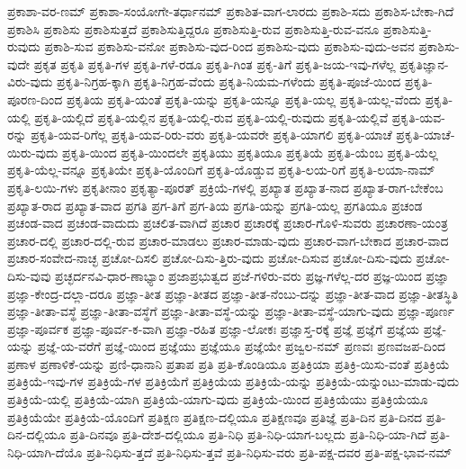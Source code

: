 {ಪ್ರಕಾಶಾ-ವರ-ಣಮ್
ಪ್ರಕಾಶಾ-ಸಂಯೋಗೇ-ತರ್ಧಾನಮ್
ಪ್ರಕಾಶಿತ-ವಾಗ-ಲಾರದು
ಪ್ರಕಾಶಿ-ಸದು
ಪ್ರಕಾಶಿಸ-ಬೇಕಾ-ಗಿದೆ
ಪ್ರಕಾಶಿಸಿ
ಪ್ರಕಾಶಿಸು
ಪ್ರಕಾಶಿಸುತ್ತದೆ
ಪ್ರಕಾಶಿಸುತ್ತಿದ್ದರೂ
ಪ್ರಕಾಶಿಸುತ್ತಿ-ರುವ
ಪ್ರಕಾಶಿಸುತ್ತಿ-ರುವ-ವನೂ
ಪ್ರಕಾಶಿಸುತ್ತಿ-ರುವುದು
ಪ್ರಕಾಶಿ-ಸುವ
ಪ್ರಕಾಶಿಸು-ವನೋ
ಪ್ರಕಾಶಿಸು-ವುದ-ರಿಂದ
ಪ್ರಕಾಶಿಸು-ವುದು
ಪ್ರಕಾಶಿಸು-ವುದು-ಅವನ
ಪ್ರಕಾಶಿಸು-ವುದೇ
ಪ್ರಕೃತ
ಪ್ರಕೃತಿ
ಪ್ರಕೃತಿ-ಗಳ
ಪ್ರಕೃತಿ-ಗಳೆ-ರಡೂ
ಪ್ರಕೃತಿ-ಗಿಂತ
ಪ್ರಕೃ-ತಿಗೆ
ಪ್ರಕೃತಿ-ಜಯ-ಇವು-ಗಳೆಲ್ಲ
ಪ್ರಕೃತಿಜ್ಞಾನ-ವಿರು-ವುದು
ಪ್ರಕೃತಿ-ನಿಗ್ರಹ-ಕ್ಕಾಗಿ
ಪ್ರಕೃತಿ-ನಿಗ್ರಹ-ವೆಂದು
ಪ್ರಕೃತಿ-ನಿಯಮ-ಗಳೆಂದು
ಪ್ರಕೃತಿ-ಪೂಜೆ-ಯಿಂದ
ಪ್ರಕೃತಿ-ಪೂರಣ-ದಿಂದ
ಪ್ರಕೃತಿಯ
ಪ್ರಕೃತಿ-ಯಂತೆ
ಪ್ರಕೃತಿ-ಯನ್ನು
ಪ್ರಕೃತಿ-ಯನ್ನೂ
ಪ್ರಕೃತಿ-ಯಲ್ಲ
ಪ್ರಕೃತಿ-ಯಲ್ಲ-ವೆಂದು
ಪ್ರಕೃತಿ-ಯಲ್ಲಿ
ಪ್ರಕೃತಿ-ಯಲ್ಲಿದೆ
ಪ್ರಕೃತಿ-ಯಲ್ಲಿನ
ಪ್ರಕೃತಿ-ಯಲ್ಲಿ-ರುವ
ಪ್ರಕೃತಿ-ಯಲ್ಲಿ-ರುವುದು
ಪ್ರಕೃತಿ-ಯಲ್ಲಿವೆ
ಪ್ರಕೃತಿ-ಯವ-ರನ್ನು
ಪ್ರಕೃತಿ-ಯವ-ರಿಗೆಲ್ಲ
ಪ್ರಕೃತಿ-ಯವ-ರಿರು-ವರು
ಪ್ರಕೃತಿ-ಯವರೇ
ಪ್ರಕೃತಿ-ಯಾಗಲಿ
ಪ್ರಕೃತಿ-ಯಾಚೆ
ಪ್ರಕೃತಿ-ಯಾಚೆ-ಯಿರು-ವುದು
ಪ್ರಕೃತಿ-ಯಿಂದ
ಪ್ರಕೃತಿ-ಯಿಂದಲೇ
ಪ್ರಕೃತಿಯು
ಪ್ರಕೃತಿಯೂ
ಪ್ರಕೃತಿಯೆ
ಪ್ರಕೃತಿ-ಯೆಂಬ
ಪ್ರಕೃತಿ-ಯೆಲ್ಲ
ಪ್ರಕೃತಿ-ಯೆಲ್ಲ-ವನ್ನೂ
ಪ್ರಕೃತಿಯೇ
ಪ್ರಕೃತಿ-ಯೊಂದಿಗೆ
ಪ್ರಕೃತಿ-ಯೊಡ್ಡುವ
ಪ್ರಕೃತಿ-ಲಯ-ರಿಗೆ
ಪ್ರಕೃತಿ-ಲಯಾ-ನಾಮ್
ಪ್ರಕೃತಿ-ಲಯಿ-ಗಳು
ಪ್ರಕೃತೀನಾಂ
ಪ್ರಕೃತ್ಯಾ-ಪೂರತ್
ಪ್ರಕ್ರಿಯೆ-ಗಳಲ್ಲಿ
ಪ್ರಖ್ಯಾತ
ಪ್ರಖ್ಯಾತ-ನಾದ
ಪ್ರಖ್ಯಾತ-ರಾಗ-ಬೇಕೆಂಬ
ಪ್ರಖ್ಯಾತ-ರಾದ
ಪ್ರಖ್ಯಾತ-ವಾದ
ಪ್ರಗತಿ
ಪ್ರಗ-ತಿಗೆ
ಪ್ರಗ-ತಿಯ
ಪ್ರಗತಿ-ಯನ್ನು
ಪ್ರಗತಿ-ಯಲ್ಲ
ಪ್ರಗತಿಯೂ
ಪ್ರಚಂಡ
ಪ್ರಚಂಡ-ವಾದ
ಪ್ರಚಂಡ-ವಾದುದು
ಪ್ರಚಲಿತ-ವಾಗಿದೆ
ಪ್ರಚಾರ
ಪ್ರಚಾರಕ್ಕೆ
ಪ್ರಚಾರ-ಗೊಳಿ-ಸುವರು
ಪ್ರಚಾರಣಾ-ಯಂತ್ರ
ಪ್ರಚಾರ-ದಲ್ಲಿ
ಪ್ರಚಾರ-ದಲ್ಲಿ-ರುವ
ಪ್ರಚಾರ-ಮಾಡಲು
ಪ್ರಚಾರ-ಮಾಡು-ವುದು
ಪ್ರಚಾರ-ವಾಗ-ಬೇಕಾದ
ಪ್ರಚಾರ-ವಾದ
ಪ್ರಚಾರ-ಸಂವೇದ-ನಾಚ್ಛ
ಪ್ರಚೋ-ದಿಸಲಿ
ಪ್ರಚೋ-ದಿಸು-ತ್ತಿರು-ವುದು
ಪ್ರಚೋ-ದಿಸುವ
ಪ್ರಚೋ-ದಿಸು-ವುದು
ಪ್ರಚೋ-ದಿಸು-ವುವು
ಪ್ರಚ್ಛರ್ದನವಿ-ಧಾರ-ಣಾಭ್ಯಾಂ
ಪ್ರಜಾಪ್ರಭುತ್ವದ
ಪ್ರಜೆ-ಗಳಿರು-ವರು
ಪ್ರಜ್ಞ-ಗಳೆಲ್ಲ-ದರ
ಪ್ರಜ್ಞ-ಯಿಂದ
ಪ್ರಜ್ಞಾ
ಪ್ರಜ್ಞಾ-ಕೇಂದ್ರ-ದಲ್ಲಾ-ದರೂ
ಪ್ರಜ್ಞಾ-ತೀತ
ಪ್ರಜ್ಞಾ-ತೀತದ
ಪ್ರಜ್ಞಾ-ತೀತ-ನೆಂಬು-ದನ್ನು
ಪ್ರಜ್ಞಾ-ತೀತ-ವಾದ
ಪ್ರಜ್ಞಾ-ತೀತಸ್ಥಿತಿ
ಪ್ರಜ್ಞಾ-ತೀತಾ-ವಸ್ಥೆ
ಪ್ರಜ್ಞಾ-ತೀತಾ-ವಸ್ಥೆಗೆ
ಪ್ರಜ್ಞಾ-ತೀತಾ-ವಸ್ಥೆ-ಯನ್ನು
ಪ್ರಜ್ಞಾ-ತೀತಾ-ವಸ್ಥೆ-ಯಾಗು-ವುದು
ಪ್ರಜ್ಞಾ-ಪೂರ್ಣ
ಪ್ರಜ್ಞಾ-ಪೂರ್ವಕ
ಪ್ರಜ್ಞಾ-ಪೂರ್ವ-ಕ-ವಾಗಿ
ಪ್ರಜ್ಞಾ-ರಹಿತ
ಪ್ರಜ್ಞಾ-ಲೋಕಃ
ಪ್ರಜ್ಞಾಸ್ತ-ರಕ್ಕೆ
ಪ್ರಜ್ಞೆ
ಪ್ರಜ್ಞೆಗೆ
ಪ್ರಜ್ಞೆಯ
ಪ್ರಜ್ಞೆ-ಯನ್ನು
ಪ್ರಜ್ಞೆ-ಯ-ವರೆಗೆ
ಪ್ರಜ್ಞೆ-ಯಿಂದ
ಪ್ರಜ್ಞೆಯು
ಪ್ರಜ್ಞೆಯೂ
ಪ್ರಜ್ಞೆಯೇ
ಪ್ರಜ್ವಲ-ನಮ್
ಪ್ರಣವಃ
ಪ್ರಣವಜಪ-ದಿಂದ
ಪ್ರಣಾಳ
ಪ್ರಣಾಳಿಕೆ-ಯನ್ನು
ಪ್ರಣಿ-ಧಾನಾನಿ
ಪ್ರತಾಪ
ಪ್ರತಿ
ಪ್ರತಿ-ಕೊಂಡಿಯೂ
ಪ್ರತಿಕ್ರಿಯಾ
ಪ್ರತಿಕ್ರಿ-ಯಿಸು-ವಂತೆ
ಪ್ರತಿಕ್ರಿಯೆ
ಪ್ರತಿಕ್ರಿಯೆ-ಇವು-ಗಳ
ಪ್ರತಿಕ್ರಿಯೆ-ಗಳ
ಪ್ರತಿಕ್ರಿಯೆಗೆ
ಪ್ರತಿಕ್ರಿಯೆಯ
ಪ್ರತಿಕ್ರಿಯೆ-ಯನ್ನು
ಪ್ರತಿಕ್ರಿಯೆ-ಯನ್ನುಂಟು-ಮಾಡು-ವುದು
ಪ್ರತಿಕ್ರಿಯೆ-ಯಲ್ಲಿ
ಪ್ರತಿಕ್ರಿಯೆ-ಯಾಗಿ
ಪ್ರತಿಕ್ರಿಯೆ-ಯಾಗು-ವುದು
ಪ್ರತಿಕ್ರಿಯೆ-ಯಿಂದ
ಪ್ರತಿಕ್ರಿಯೆಯು
ಪ್ರತಿಕ್ರಿಯೆಯೂ
ಪ್ರತಿಕ್ರಿಯೆಯೇ
ಪ್ರತಿಕ್ರಿಯೆ-ಯೊಂದಿಗೆ
ಪ್ರತಿಕ್ಷಣ
ಪ್ರತಿಕ್ಷಣ-ದಲ್ಲಿಯೂ
ಪ್ರತಿಕ್ಷಣವೂ
ಪ್ರತಿಜ್ಞೆ
ಪ್ರತಿ-ದಿನ
ಪ್ರತಿ-ದಿನದ
ಪ್ರತಿ-ದಿನ-ದಲ್ಲಿಯೂ
ಪ್ರತಿ-ದಿನವೂ
ಪ್ರತಿ-ದೇಶ-ದಲ್ಲಿಯೂ
ಪ್ರತಿ-ನಿಧಿ
ಪ್ರತಿ-ನಿಧಿ-ಯಾಗ-ಬಲ್ಲದು
ಪ್ರತಿ-ನಿಧಿ-ಯಾ-ಗಿದೆ
ಪ್ರತಿ-ನಿಧಿ-ಯಾಗಿ-ದೆಯೊ
ಪ್ರತಿ-ನಿಧಿಸು-ತ್ತದೆ
ಪ್ರತಿ-ನಿಧಿಸು-ತ್ತವೆ
ಪ್ರತಿ-ನಿಧಿಸು-ವರು
ಪ್ರತಿ-ಪಕ್ಷ-ದವರ
ಪ್ರತಿ-ಪಕ್ಷ-ಭಾವ-ನಮ್
}
